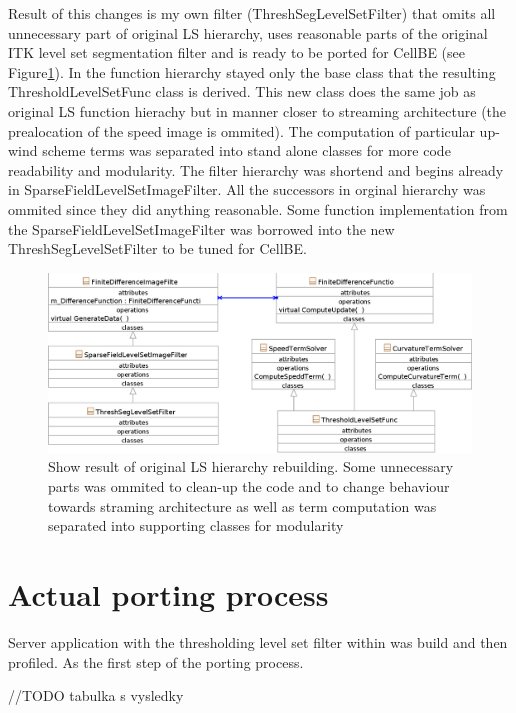 Result of this changes is my own filter (ThreshSegLevelSetFilter) that omits all unnecessary part of original LS hierarchy, uses reasonable parts of the original ITK level set segmentation filter and is ready to be ported for CellBE (see Figure\ref{fg:resultingFilter}). In the function hierarchy stayed only the base class that the resulting ThresholdLevelSetFunc class is derived. This new class does the same job as original LS function hierachy but in manner closer to streaming architecture (the prealocation of the speed image is ommited). The computation of particular up-wind scheme terms was separated into stand alone classes for more code readability and modularity. The filter hierarchy was shortend and begins already in SparseFieldLevelSetImageFilter. All the successors in orginal hierarchy was ommited since they did anything reasonable. Some function implementation from the SparseFieldLevelSetImageFilter was borrowed into the new ThreshSegLevelSetFilter to be tuned for CellBE.

\begin{figure}
    \centering
    \includegraphics[width=15cm]{data/resultingFilter.eps}
    \caption[Resulting level set filter ready to be ported to CellBE]{Show result of original LS hierarchy rebuilding. Some unnecessary parts was ommited to clean-up the code and to change behaviour towards straming architecture as well as term computation was separated into supporting classes for modularity}
    \label{fg:resultingFilter}
\end{figure}

\section{Actual porting process}

Server application with the thresholding level set filter within was build and then profiled. As the first step of the porting process.

//TODO tabulka s vysledky

